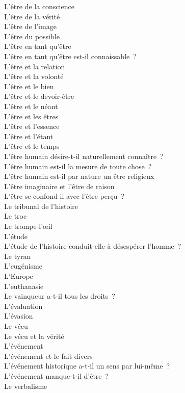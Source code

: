 \documentclass[a4paper,12pt]{article}
\begin{document}
L'être de la conscience \\
L'être de la vérité \\
L'être de l'image \\
L'être du possible \\
L'être en tant qu'être \\
L'être en tant qu'être est-il connaissable ? \\
L'être et la relation \\
L'être et la volonté \\
L'être et le bien \\
L'être et le devoir-être \\
L'être et le néant \\
L'être et les êtres \\
L'être et l'essence \\
L'être et l'étant \\
L'être et le temps \\
L'être humain désire-t-il naturellement connaître ? \\
L'être humain est-il la mesure de toute chose ? \\
L'être humain est-il par nature un être religieux \\
L'être imaginaire et l'être de raison \\
L'être se confond-il avec l'être perçu ? \\
Le tribunal de l'histoire \\
Le troc \\
Le trompe-l'œil \\
L'étude \\
L'étude de l'histoire conduit-elle à désespérer l'homme ? \\
Le tyran \\
L'eugénisme \\
L'Europe \\
L'euthanasie \\
Le vainqueur a-t-il tous les droits ? \\
L'évaluation \\
L'évasion \\
Le vécu \\
Le vécu et la vérité \\
L'événement \\
L'événement et le fait divers \\
L'événement historique a-t-il un sens par lui-même ? \\
L'événement manque-t-il d'être ? \\
Le verbalisme \\
\end{document}

